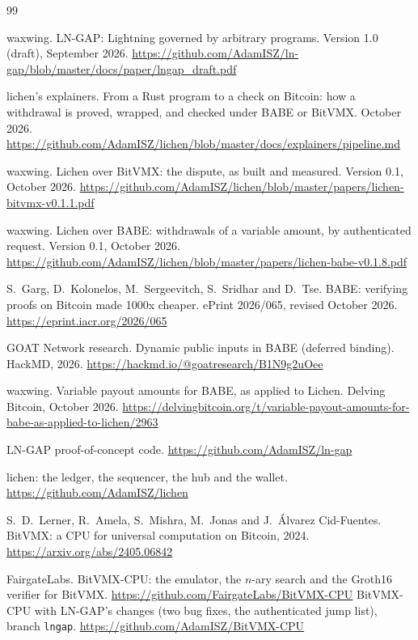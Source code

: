 \documentclass[11pt]{article}
\begin{document}
\begin{thebibliography}{99}

 waxwing. LN-GAP: Lightning governed by arbitrary programs. Version 1.0 (draft), September 2026. \url{https://github.com/AdamISZ/ln-gap/blob/master/docs/paper/lngap_draft.pdf}

 lichen's explainers. From a Rust program to a check on Bitcoin: how a withdrawal is proved, wrapped, and checked under BABE or BitVMX. October 2026. \url{https://github.com/AdamISZ/lichen/blob/master/docs/explainers/pipeline.md}

 waxwing. Lichen over BitVMX: the dispute, as built and measured. Version 0.1, October 2026. \url{https://github.com/AdamISZ/lichen/blob/master/papers/lichen-bitvmx-v0.1.1.pdf}

 waxwing. Lichen over BABE: withdrawals of a variable amount, by authenticated request. Version 0.1, October 2026. \url{https://github.com/AdamISZ/lichen/blob/master/papers/lichen-babe-v0.1.8.pdf}

 S.~Garg, D.~Kolonelos, M.~Sergeevitch, S.~Sridhar and D.~Tse. BABE: verifying proofs on Bitcoin made 1000x cheaper. ePrint 2026/065, revised October 2026. \url{https://eprint.iacr.org/2026/065}

 GOAT Network research. Dynamic public inputs in BABE (deferred binding). HackMD, 2026. \url{https://hackmd.io/@goatresearch/B1N9g2uOee}

 waxwing. Variable payout amounts for BABE, as applied to Lichen. Delving Bitcoin, October 2026. \url{https://delvingbitcoin.org/t/variable-payout-amounts-for-babe-as-applied-to-lichen/2963}

 LN-GAP proof-of-concept code. \url{https://github.com/AdamISZ/ln-gap}

 lichen: the ledger, the sequencer, the hub and the wallet. \url{https://github.com/AdamISZ/lichen}

 S.~D.~Lerner, R.~Amela, S.~Mishra, M.~Jonas and J.~\'Alvarez Cid-Fuentes. BitVMX: a CPU for universal computation on Bitcoin, 2024. \url{https://arxiv.org/abs/2405.06842}

 FairgateLabs. BitVMX-CPU: the emulator, the $n$-ary search and the Groth16 verifier for BitVMX. \url{https://github.com/FairgateLabs/BitVMX-CPU}
 BitVMX-CPU with LN-GAP's changes (two bug fixes, the authenticated jump list), branch \texttt{lngap}. \url{https://github.com/AdamISZ/BitVMX-CPU}


\end{thebibliography}
\end{document}
